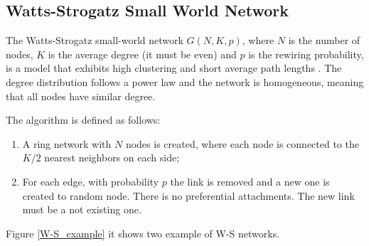 \subsection{Watts-Strogatz Small World Network}

The Watts-Strogatz small-world network $G(N, K, p)$, where $N$ is the number of nodes, $K$ is the average degree (it must be even) and $p$ is the rewiring probability, is a model that exhibits high clustering and short average path lengths \cite{Watts-Strogatz_1998}. The degree distribution follows a power law and the network is homogeneous, meaning that all nodes have similar degree.

The algorithm is defined as follows:
\begin{enumerate}
    \item A ring network with $N$ nodes is created, where each node is connected to the $K/2$ nearest neighbors on each side;
    \item For each edge, with probability $p$ the link is removed and a new one is created to random node. There is no preferential attachments. The new link must be a not existing one.
\end{enumerate}

Figure \ref{W-S_example} it shows two example of W-S networks.

